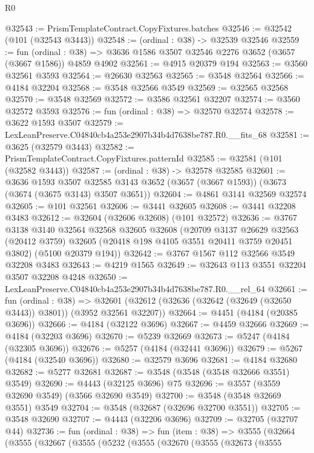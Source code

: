 \begin{lexlean}{R0}
\begin{coremodule}
@32543 := PrismTemplateContract.CopyFixtures.batches
@32546 := @32542 (@101 (@32543 @3443))
@32548 := (ordinal : @38) -> @32539 @32546
@32559 := fun (ordinal : @38) =>
  @3636 @1586 @3507 @32546 @2276 @3652 (@3657 (@3667 @1586)) @4859 @4902
@32561 := @4915 @20379 @194
@32563 := @3560 @32561 @3593
@32564 := @26630 @32563
@32565 := @3548 @32564
@32566 := @4184 @32204
@32568 := @3548 @32566 @3549
@32569 := @32565 @32568
@32570 := @3548 @32569
@32572 := @3586 @32561 @32207
@32574 := @3560 @32572 @3593
@32576 := fun (ordinal : @38) => @32570 @32574
@32578 := @3622 @1593 @3507
@32579 := LexLeanPreserve.C04840cb4a253e2907b34b4d7638be787.R0.__fits_68
@32581 := @3625 (@32579 @3443)
@32582 := PrismTemplateContract.CopyFixtures.patternId
@32585 := @32581 (@101 (@32582 @3443))
@32587 := (ordinal : @38) -> @32578 @32585
@32601 := @3636
    @1593
    @3507
    @32585
    @3143
    @3652
    (@3657 (@3667 @1593))
    (@3673 (@3674 (@3675 @3143) @3507 @3651))
@32604 := @4861 @3141 @32569 @32574
@32605 := @101 @32561
@32606 := @3441 @32605
@32608 := @3441 @32208 @3483
@32612 := @32604 (@32606 @32608) (@101 @32572)
@32636 := @3767
    @3138
    @3140
    @32564
    @32568
    @32605
    @32608
    (@20709
      @3137
      @26629
      @32563
      (@20412 @3759)
      @32605
      (@20418 @198 @4105 @3551 @20411 @3759 @20451 @3802)
      (@5100 @20379 @194))
@32642 := @3767 @1567 @112 @32566 @3549 @32208 @3483
@32643 := @4219 @1565
@32649 := @32643 @113 @3551 @32204 @3507 @32208 @4248
@32650 := LexLeanPreserve.C04840cb4a253e2907b34b4d7638be787.R0.__rel_64
@32661 := fun (ordinal : @38) =>
  @32601 (@32612 (@32636 (@32642 (@32649 (@32650 @3443)) @3801)) (@3952 @32561 @32207))
@32664 := @4451 (@4184 (@20385 @3696))
@32666 := @4184 (@32122 @3696)
@32667 := @4459 @32666
@32669 := @4184 (@32203 @3696)
@32670 := @5239 @32669
@32673 := @5247 (@4184 (@32305 @3696))
@32676 := @5257 (@4184 (@32441 @3696))
@32679 := @5267 (@4184 (@32540 @3696))
@32680 := @32579 @3696
@32681 := @4184 @32680
@32682 := @5277 @32681
@32687 := @3548 (@3548 (@3548 @32666 @3551) @3549)
@32690 := @4443 (@32125 @3696) @75
@32696 := @3557 (@3559 @32690 @3549) (@3566 @32690 @3549)
@32700 := @3548 (@3548 @32669 @3551) @3549
@32704 := @3548 (@32687 (@32696 @32700 @3551))
@32705 := @3548 @32690
@32707 := @4443 (@32206 @3696)
@32709 := @32705 (@32707 @44)
@32736 := fun (ordinal : @38) =>
  fun (item : @38) =>
  @3555
    (@32664
      (@3555
        (@32667
          (@3555
            (@5232
              (@3555
                (@32670
                  (@3555
                    (@32673
                      (@3555

\end{coremodule}
\end{lexlean}
